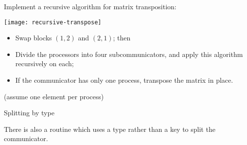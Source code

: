 \begin{exercise}
  \label{ex:recursivetranspose}
  Implement a recursive algorithm for matrix transposition:
  
  \texttt{[image: recursive-transpose]}

  \begin{itemize}
  \item Swap blocks $(1,2)$ and $(2,1)$; then
  \item Divide the processors into four subcommunicators, and
    apply this algorithm recursively on each;
  \item If the communicator has only one process, transpose the matrix in place.
  \end{itemize}
  (assume one element per process)
\end{exercise}

 {Splitting by type}
\label{mpi-comm-split-type}

There is also a routine 
which uses a type rather than a key to split the communicator.

